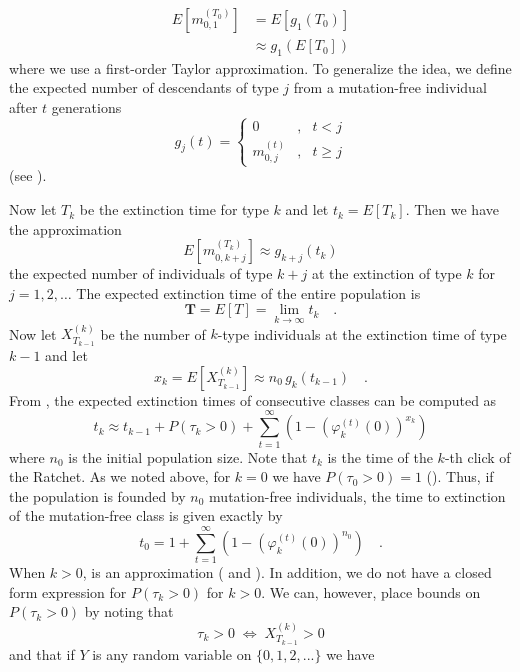 \documentclass[9pt,lineno]{elife}
\begin{document}
\begin{align*}
%
E\left[m_{0,1}^{(T_{0})}\right] &=  E[g_{1}(T_{0})]\\
&\approx  g_{1}\left(E[T_{0}]\right)
%
\end{align*}
%
where we use a first-order Taylor approximation. To generalize the idea, 
we define the 
expected number of descendants of type $j$ from a mutation-free individual after $t$ generations
%
\begin{equation}
g_{j}(t) = \left\{\begin{array}{lll}
%
    0              & , & t<j       \\ [4pt]
	m^{(t)}_{0, j} & , & t \geq j
    \end{array}
%
\right. 
\label{eq:gj}
\end{equation}
%
(see ).


Now let $T_{k}$ be the extinction time for type $k$ and let $t_{k}=E[T_{k}]$. Then we have the approximation
%
\begin{equation}
E\left[m_{0,k+j}^{(T_{k})}\right]\approx g_{k+j}(t_{k})
\label{eq:approx}
\end{equation}
%
the expected number of individuals of type $k+j$ at the extinction of type $k$ for $j=1,2,\ldots$ The expected extinction time of the entire population is
%
\begin{equation}
%
\mathbf{T} = E[T] = \lim_{k\rightarrow\infty}t_{k} \quad .
%
\label{eq:T}
\end{equation}
%
Now let $X_{T_{k-1}}^{(k)}$ 
be the number of $k$-type individuals at the extinction time of type $k-1$ and let 
%
\begin{equation}
%
x_{k} = E\left[X_{T_{k-1}}^{(k)}\right] \approx n_{0} \, g_{k}(t_{k-1}) \quad .
%
\label{eq:xk}
\end{equation}
%
From , the expected extinction times of consecutive classes can be computed as 
%
\begin{equation}
%
t_{k}\approx t_{k-1}+P(\tau_{k}>0)+\sum_{t=1}^{\infty}\left(1-\left(\varphi_{k}^{(t)}(0)\right)^{x_{k}}\right)
%
\label{eq:tk}
\end{equation}
%
where $n_0$ is the initial population size.  
Note that $t_k$ is the time of the $k$-th click of the Ratchet.
As we noted above, for $k=0$ we have $P(\tau_{0}>0)=1$ 
().  Thus, if the population is founded by $n_0$ mutation-free individuals, the time to extinction of the mutation-free class is given exactly by
%
\begin{equation}
t_{0} = 1+\sum_{t=1}^{\infty}\left(1-\left(\varphi_{k}^{(t)}(0)\right)^{n_{0}}\right) \quad .
\label{eq:t0}
\end{equation}
%
When $k>0$,  is an approximation ( and ).
In addition, we do not have a closed form expression for $P(\tau_{k}>0)$ for $k>0$.
We can, however, place bounds on $P(\tau_{k}>0)$ by noting that
%
\begin{equation}
\tau_{k} > 0 \; \Leftrightarrow \; X_{T_{k-1}}^{(k)} > 0
\label{eq:tauk2}
\end{equation}
%
and that if $Y$ is any random variable on $\{0, 1, 2, ...\}$ we have
\end{document}
